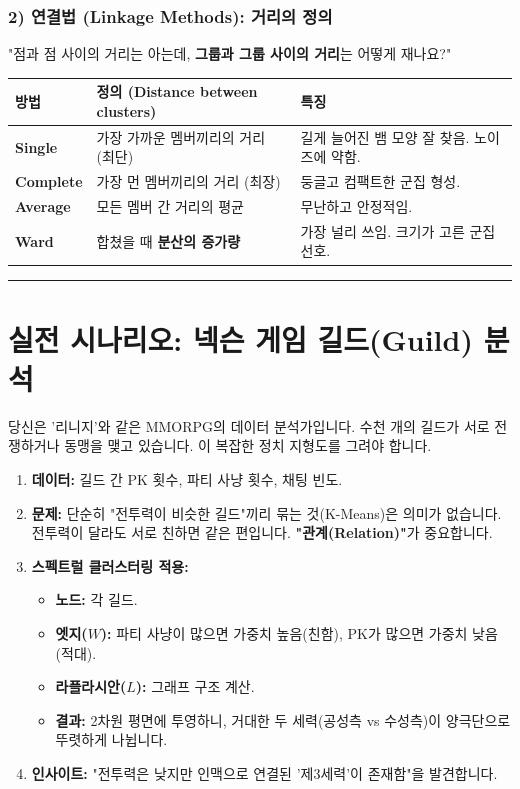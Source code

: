 \documentclass[11pt,a4paper]{book}
\theoremstyle{definition}
\begin{document}
\subsubsection*{2) 연결법 (Linkage Methods): 거리의 정의}
"점과 점 사이의 거리는 아는데, \textbf{그룹과 그룹 사이의 거리}는 어떻게 재나요?"
\begin{table}[h]
\centering
\begin{tabular}{l|l|l}
\toprule
\textbf{방법} & \textbf{정의 (Distance between clusters)} & \textbf{특징} \\
\midrule
\textbf{Single} & 가장 가까운 멤버끼리의 거리 (최단) & 길게 늘어진 뱀 모양 잘 찾음. 노이즈에 약함. \\
\textbf{Complete} & 가장 먼 멤버끼리의 거리 (최장) & 둥글고 컴팩트한 군집 형성. \\
\textbf{Average} & 모든 멤버 간 거리의 평균 & 무난하고 안정적임. \\
\textbf{Ward} & 합쳤을 때 \textbf{분산의 증가량} & 가장 널리 쓰임. 크기가 고른 군집 선호. \\
\bottomrule
\end{tabular}
\end{table}

\vspace{0.5cm}\hrule\vspace{0.5cm}

\section{실전 시나리오: 넥슨 게임 길드(Guild) 분석}

\begin{storybox}[title={Scenario: 적대 길드와 동맹 길드 파악}]
당신은 '리니지'와 같은 MMORPG의 데이터 분석가입니다. 수천 개의 길드가 서로 전쟁하거나 동맹을 맺고 있습니다. 이 복잡한 정치 지형도를 그려야 합니다.
\end{storybox}

\begin{enumerate}
    \item \textbf{데이터:} 길드 간 PK 횟수, 파티 사냥 횟수, 채팅 빈도.
    \item \textbf{문제:} 단순히 "전투력이 비슷한 길드"끼리 묶는 것(K-Means)은 의미가 없습니다. 전투력이 달라도 서로 친하면 같은 편입니다. \textbf{"관계(Relation)"}가 중요합니다.
    \item \textbf{스펙트럴 클러스터링 적용:}
    \begin{itemize}
        \item \textbf{노드:} 각 길드.
        \item \textbf{엣지($W$):} 파티 사냥이 많으면 가중치 높음(친함), PK가 많으면 가중치 낮음(적대).
        \item \textbf{라플라시안($L$):} 그래프 구조 계산.
        \item \textbf{결과:} 2차원 평면에 투영하니, 거대한 두 세력(공성측 vs 수성측)이 양극단으로 뚜렷하게 나뉩니다.
    \end{itemize}
    \item \textbf{인사이트:} "전투력은 낮지만 인맥으로 연결된 '제3세력'이 존재함"을 발견합니다.
\end{enumerate}
\end{document}
